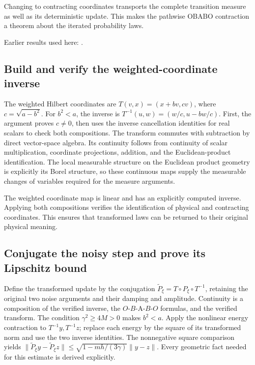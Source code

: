 \documentclass[11pt,a4paper]{report}
\begin{document}
Changing to contracting coordinates transports the complete transition measure as well as its deterministic update. This makes the pathwise OBABO contraction a theorem about the iterated probability laws.



Earlier results used here: \cite[Section~3.33]{LangevinLean2026ULASC}.
\subsection{\texorpdfstring{Build and verify the weighted-coordinate inverse}{Build and verify the weighted-coordinate inverse}}
\label{report-step-KineticLangevin-OBABOLaw-lean-1}


The weighted Hilbert coordinates are \(T(v,x)=(x+bv,c v)\), where \(c=\sqrt{a-b^2}\). For \(b^2<a\), the inverse is \(T^{-1}(u,w)=(w/c,u-bw/c)\). First, the argument proves \(c\ne0\), then uses the inverse cancellation identities for real scalars to check both compositions. The transform commutes with subtraction by direct vector-space algebra. Its continuity follows from continuity of scalar multiplication, coordinate projections, addition, and the Euclidean-product identification. The local measurable structure on the Euclidean product geometry is explicitly its Borel structure, so these continuous maps supply the measurable changes of variables required for the measure arguments.



The weighted coordinate map is linear and has an explicitly computed inverse. Applying both compositions verifies the identification of physical and contracting coordinates. This ensures that transformed laws can be returned to their original physical meaning.

\subsection{\texorpdfstring{Conjugate the noisy step and prove its Lipschitz bound}{Conjugate the noisy step and prove its Lipschitz bound}}
\label{report-step-KineticLangevin-OBABOLaw-lean-2}


Define the transformed update by the conjugation \(\widetilde P_\xi=T\circ P_\xi\circ T^{-1}\), retaining the original two noise arguments and their damping and amplitude. Continuity is a composition of the verified inverse, the \(O\)-\(B\)-A-\(B\)-\(O\) formulas, and the verified transform. The condition \(\gamma^2\ge4M>0\) makes \(b^2<a\). Apply the nonlinear energy contraction to \(T^{-1}y,T^{-1}z\); replace each energy by the square of its transformed norm and use the two inverse identities. The nonnegative square comparison yields \(\|\widetilde P_\xi y-\widetilde P_\xi z\|\le\sqrt{1-mh/(3\gamma)}\|y-z\|\). Every geometric fact needed for this estimate is derived explicitly.
\end{document}
